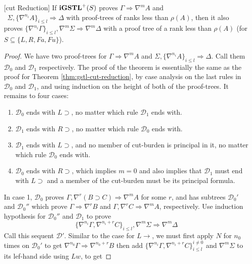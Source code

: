 \begin{thm}\label{thm:igstl-cut-reduction}[cut Reduction]
  If $\mathbf{iGSTL}^+(S)$ proves $\Gamma \Rightarrow \nabla^m A$ and\\\ $\Sigma , \{\nabla^{n_i} A\}_{i \leq l} \Rightarrow \Delta$ with proof-trees of ranks less than $\rho(A)$, then it also proves $\{\nabla^{n_i} \Gamma\}_{i \leq l} , \nabla^m\Sigma \Rightarrow \nabla^m\Delta$ with a proof tree of a rank less than $\rho(A)$ (for $S \subseteq \{L, R, Fa, Fu\}$).
\end{thm}
\begin{proof}
  We have two proof-trees for $\Gamma \Rightarrow \nabla^m A$ and $\Sigma , \{\nabla^{n_i} A\}_{i \leq l} \Rightarrow \Delta$. Call them $\mathcal{D}_0$ and $\mathcal{D}_1$ respectively. The proof of the theorem is essentially the same as the proof for Theorem \ref{thm:gstl-cut-reduction}, by case analysis on the last rules in $\mathcal{D}_0$ and $\mathcal{D}_1$, and using induction on the height of both of the proof-trees. It remains to four cases:
  \begin{enumerate}
    \item $\mathcal{D}_0$ ends with $L \supset$, no matter which rule $\mathcal{D}_1$ ends with.
    \item $\mathcal{D}_1$ ends with $R \supset$, no matter which rule $\mathcal{D}_0$ ends with.
    \item $\mathcal{D}_1$ ends with $L \supset$, and no member of cut-burden is principal in it, no matter which rule $\mathcal{D}_0$ ends with.
    \item $\mathcal{D}_0$ ends with $R \supset$, which implies $m = 0$ and also implies that $\mathcal{D}_1$ must end with $L \supset$ and a member of the cut-burden must be its principal formula.
  \end{enumerate}
  In case 1, $\mathcal{D}_0$ proves $\Gamma, \nabla^r (B \supset C) \Rightarrow \nabla^m A$ for some $r$, and has subtrees $\mathcal{D}_0'$ and $\mathcal{D}_0''$ which prove $\Gamma \Rightarrow \nabla^r B$ and $\Gamma, \nabla^r C \Rightarrow \nabla^m A$, respectively. Use induction hypothesis for $\mathcal{D}_0''$ and $\mathcal{D}_1$ to prove
  $$\{ \nabla^{n_i} \Gamma, \nabla^{n_i+r} C \}_{i \leq l}, \nabla^m \Sigma \Rightarrow \nabla^m \Delta$$
  Call this sequent $\mathcal{D}'$. Similar to the case for $L \rightarrow$, we must first apply $N$ for $n_0$ times on $\mathcal{D}_0'$ to get $\nabla^{n_0} \Gamma \Rightarrow \nabla^{n_0+r} B$ then add $\{\nabla^{n_i} \Gamma, \nabla^{n_i+r}C\}_{i \leq l}^{i \neq 0}$ and $\nabla^m \Sigma$ to its lef-hand side using $Lw$, to get

\end{proof}
